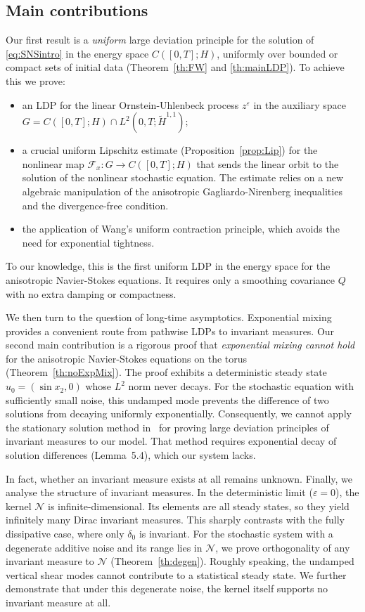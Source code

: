 \documentclass[11pt,a4paper,reqno]{amsart}
\theoremstyle{definition}
\begin{document}
\subsection{Main contributions}
Our first result is a \emph{uniform} large deviation principle
for the solution of \eqref{eq:SNSintro} in the energy space $C([0,T];H)$,
uniformly over bounded or compact sets of initial data (Theorem~\ref{th:FW} and \ref{th:mainLDP}).  To achieve
this we prove:
\begin{itemize}
  \item an LDP for the linear Ornstein-Uhlenbeck process $z^\varepsilon$ in the
    auxiliary space $G = C([0,T];H)\cap L^2(0,T;\widetilde H^{1,1})$;
  \item a crucial uniform Lipschitz estimate (Proposition~\ref{prop:Lip}) for the
    nonlinear map $\mathcal F_x : G \to C([0,T];H)$ that sends the linear orbit
    to the solution of the nonlinear stochastic equation.
    The estimate relies on a new algebraic manipulation of the anisotropic Gagliardo-Nirenberg
    inequalities and the divergence-free condition.
  \item the application of Wang's uniform contraction principle, which avoids the
    need for exponential tightness.
\end{itemize}

To our knowledge, this is the first uniform LDP in the energy space for the anisotropic Navier-Stokes equations.
It requires only a smoothing covariance $Q$ with no extra damping or compactness.


We then turn to the question of long-time asymptotics.  Exponential mixing provides a convenient route
from pathwise LDPs to invariant measures.
Our second main contribution is a rigorous proof
that \emph{exponential mixing cannot hold} for the anisotropic Navier-Stokes
equations on the torus (Theorem~\ref{th:noExpMix}).  The proof exhibits a
deterministic steady state $u_0=(\sin x_2,0)$ whose $L^2$ norm never decays.
For the stochastic equation with sufficiently small noise,
this undamped mode prevents the difference of two solutions
from decaying uniformly exponentially.
Consequently, we cannot apply the stationary solution method in~\cite{LiuTangZhang}
for proving large deviation principles
of invariant measures to our model.
That method requires exponential decay of solution differences (Lemma~5.4), which our system lacks.



In fact, whether an invariant measure exists at all remains unknown. Finally, we analyse the structure of invariant measures.
In the deterministic
limit ($\varepsilon=0$), the kernel $\mathcal N$ is infinite-dimensional.
Its elements are all steady states, so they yield infinitely many Dirac invariant measures.
This sharply contrasts with the fully dissipative case, where only $\delta_0$ is invariant.
For the stochastic system with a degenerate additive noise and its range lies in $\mathcal N$,
we prove orthogonality of any invariant measure to $\mathcal N$ (Theorem~\ref{th:degen}).
Roughly speaking, the undamped vertical shear modes cannot contribute to a statistical steady state.
We further demonstrate that under this degenerate noise, the kernel
itself supports no invariant measure at all.
\end{document}
